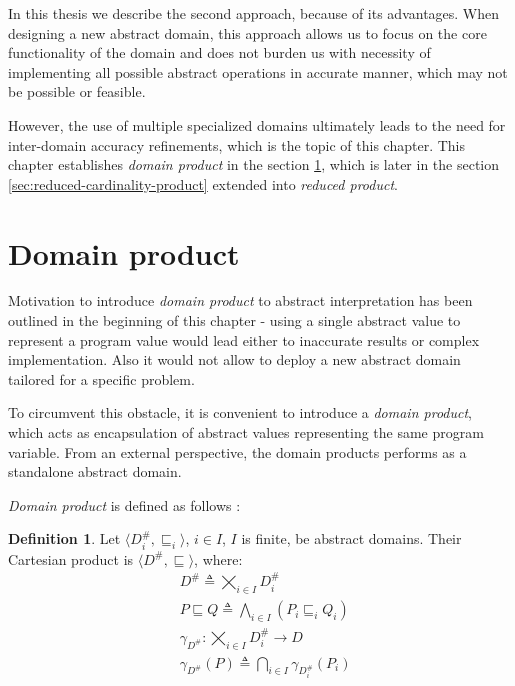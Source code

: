 \documentclass[12pt,oneside]{fithesis2}
\theoremstyle{definition}
\newtheorem{definition}{Definition}
\begin{document}
\vspace{1.5\baselineskip} %

In this thesis we describe the second approach, because of its advantages. When designing a new abstract domain, this approach allows us to focus on the core functionality of the domain and does not burden us with necessity of implementing all possible abstract operations in accurate manner, which may not be possible or feasible.

However, the use of multiple specialized domains ultimately leads to the need for inter-domain accuracy refinements, which is the topic of this chapter. This chapter establishes \textit{domain product} in the section \ref{sec:domain-product}, which is later in the section \ref{sec:reduced-cardinality-product} extended into \textit{reduced product}.

\section{Domain product}\label{sec:domain-product}

Motivation to introduce \textit{domain product} to abstract interpretation has been outlined in the beginning of this chapter - using a single abstract value to represent a program value would lead either to inaccurate results or complex implementation. Also it would not allow to deploy a new abstract domain tailored for a specific problem. \cite{CousotEtAl06-ASIAN}

To circumvent this obstacle, it is convenient to introduce a \textit{domain product}, which acts as encapsulation of abstract values representing the same program variable. From an external perspective, the domain products performs as a standalone abstract domain.

\textit{Domain product} is defined as follows \cite{CousotCousotMauborgne-FoSSaCS-11}:

\begin{definition}
  Let $\langle D^\#_i, \sqsubseteq_i \rangle$, $i \in I$, $I$ is finite, be abstract domains. Their Cartesian product is $\langle D^\#, \sqsubseteq \rangle$, where:
  \begin{align*}
    &D^\# \triangleq \bigtimes_{i \in I} D^\#_i\\
    &P \sqsubseteq Q \triangleq \bigwedge_{i \in I}\left(P_i \sqsubseteq_i Q_i \right)\\
    &\gamma_{D^\#}: \bigtimes_{i \in I} D^\#_i \to D\\
    &\gamma_{D^\#}(P) \triangleq \bigcap_{i \in I} \gamma_{D^\#_i}\left( P_i \right)
  \end{align*}
\end{definition}
\end{document}
